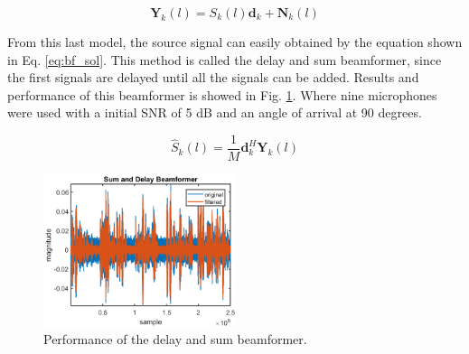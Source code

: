 \begin{equation}
  \mathbf{Y}_{k}(l) = S_{k}(l)\mathbf{d}_{k} + \mathbf{N}_{k}(l)
  \label{eq:bf_model}
\end{equation}

From this last model, the source signal can easily obtained by the equation shown in Eq. \ref{eq:bf_sol}. This method is called the delay and sum beamformer, since the first signals are delayed until all the signals can be added. Results and performance of this beamformer is showed in Fig. \ref{fig:bf}. Where nine microphones were used with a initial SNR of 5 dB and an angle of arrival at 90 degrees.

\begin{equation}
   \hat S_{k}(l) =\frac{1}{M} \mathbf{d}_{k}^{H}\mathbf{Y}_{k}(l)
  \label{eq:bf_sol}
\end{equation}

\begin{figure}[h]
  \centering
  \includegraphics[width=0.5\textwidth]{images/beamformer_sum_delay.png}
  \caption{Performance of the delay and sum beamformer.}
  \label{fig:bf}
\end{figure}
